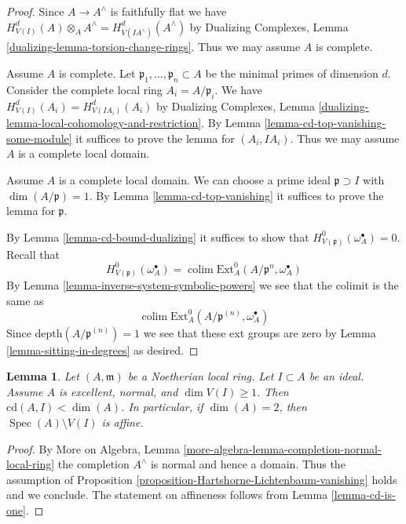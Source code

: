 \documentclass{stacks-project}
\theoremstyle{plain}
\newtheorem{lemma}[subsection]{Lemma}
\theoremstyle{definition}
\theoremstyle{remark}
\numberwithin{equation}{subsection}
\def\colim{\mathop{\mathrm{colim}}\nolimits}
\def\Spec{\mathop{\mathrm{Spec}}}
\begin{document}
\begin{proof}
Since $A \to A^\wedge$ is faithfully flat we have
$H^d_{V(I)}(A) \otimes_A A^\wedge = H^d_{V(IA^\wedge)}(A^\wedge)$
by Dualizing Complexes, Lemma \ref{dualizing-lemma-torsion-change-rings}.
Thus we may assume $A$ is complete.

\medskip\noindent
Assume $A$ is complete. Let $\mathfrak p_1, \ldots, \mathfrak p_n \subset A$
be the minimal primes of dimension $d$. Consider the complete local ring
$A_i = A/\mathfrak p_i$. We have $H^d_{V(I)}(A_i) = H^d_{V(IA_i)}(A_i)$
by Dualizing Complexes, Lemma
\ref{dualizing-lemma-local-cohomology-and-restriction}.
By Lemma \ref{lemma-cd-top-vanishing-some-module}
it suffices to prove the lemma for $(A_i, IA_i)$.
Thus we may assume $A$ is a complete local domain.

\medskip\noindent
Assume $A$ is a complete local domain. We can choose a prime ideal
$\mathfrak p \supset I$ with $\dim(A/\mathfrak p) = 1$.
By Lemma \ref{lemma-cd-top-vanishing}
it suffices to prove the lemma for $\mathfrak p$.

\medskip\noindent
By Lemma \ref{lemma-cd-bound-dualizing} it suffices to show that
$H^0_{V(\mathfrak p)}(\omega_A^\bullet) = 0$.
Recall that
$$
H^0_{V(\mathfrak p)}(\omega_A^\bullet) =
\colim \text{Ext}^0_A(A/\mathfrak p^n, \omega_A^\bullet)
$$
By Lemma \ref{lemma-inverse-system-symbolic-powers}
we see that the colimit is the same as
$$
\colim \text{Ext}^0_A(A/\mathfrak p^{(n)}, \omega_A^\bullet)
$$
Since $\text{depth}(A/\mathfrak p^{(n)}) = 1$ we see that
these ext groups are zero by Lemma \ref{lemma-sitting-in-degrees}
as desired.
\end{proof}

\begin{lemma}
\label{lemma-affine-complement}
Let $(A, \mathfrak m)$ be a Noetherian local ring.
Let $I \subset A$ be an ideal. Assume $A$ is excellent,
normal, and $\dim V(I) \geq 1$. Then $\text{cd}(A, I) < \dim(A)$.
In particular, if $\dim(A) = 2$, then $\Spec(A) \setminus V(I)$ is affine.
\end{lemma}

\begin{proof}
By More on Algebra, Lemma
\ref{more-algebra-lemma-completion-normal-local-ring}
the completion $A^\wedge$ is normal and hence a domain.
Thus the assumption of
Proposition \ref{proposition-Hartshorne-Lichtenbaum-vanishing}
holds and we conclude. The statement on affineness
follows from Lemma \ref{lemma-cd-is-one}.
\end{proof}
\end{document}
